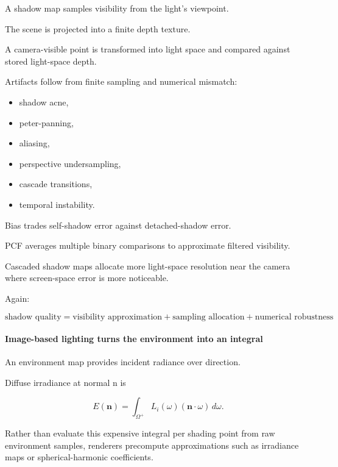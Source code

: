 \hypertarget{03-visual-computing-i-ch001-shadow-mapping-is-another-sampling-problem}{}

A shadow map samples visibility from the light's viewpoint.

The scene is projected into a finite depth texture.

A camera-visible point is transformed into light space and compared against stored light-space depth.

Artifacts follow from finite sampling and numerical mismatch:

\begin{itemize}
\tightlist
\item
  shadow acne,
\item
  peter-panning,
\item
  aliasing,
\item
  perspective undersampling,
\item
  cascade transitions,
\item
  temporal instability.
\end{itemize}

Bias trades self-shadow error against detached-shadow error.

PCF averages multiple binary comparisons to approximate filtered visibility.

Cascaded shadow maps allocate more light-space resolution near the camera where screen-space error is more noticeable.

Again:

\[
\boxed{
\text{shadow quality}
=
\text{visibility approximation}
+
\text{sampling allocation}
+
\text{numerical robustness}
}
\]

\paragraph{Image-based lighting turns the environment into an integral}\label{03-visual-computing-i-ch001-image-based-lighting-turns-the-environment-into-an-integral}

\hypertarget{03-visual-computing-i-ch001-image-based-lighting-turns-the-environment-into-an-integral}{}

An environment map provides incident radiance over direction.

Diffuse irradiance at normal n is

\[
E(\mathbf n)
=
\int_{\Omega^+}
L_i(\omega)
(\mathbf n\cdot\omega)
\,d\omega.
\]

Rather than evaluate this expensive integral per shading point from raw environment samples, renderers precompute approximations such as irradiance maps or spherical-harmonic coefficients.

